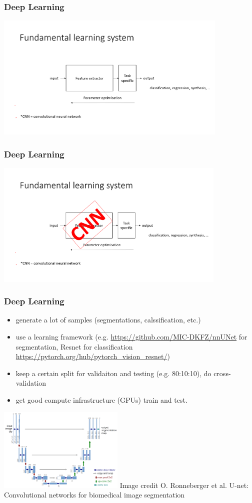 \begin{frame}
    \frametitle{Deep Learning}
    \includegraphics[height=6cm]{img/woCNN.png}
\end{frame}

\begin{frame}
    \frametitle{Deep Learning}
    \includegraphics[height=6cm]{img/wCNN.png}
\end{frame}


\begin{frame}
    \frametitle{Deep Learning}
    \begin{itemize}
        \item generate a lot of samples (segmentations, calssification, etc.)
        \item use a learning framework (e.g. \url{https://github.com/MIC-DKFZ/nnUNet} for segmentation, Resnet for classification \url{https://pytorch.org/hub/pytorch_vision_resnet/})
        \item keep a certain split for validaiton and testing (e.g. 80:10:10), do cross-validation
        \item get good compute infrastructure (GPUs) train and test.
    \end{itemize}
    \begin{center}
 \includegraphics[height=4cm]{img/u-net-architecture.png}
{\tiny Image credit O. Ronneberger et al. U-net: Convolutional networks for biomedical image segmentation}
 \end{center}
\end{frame}

